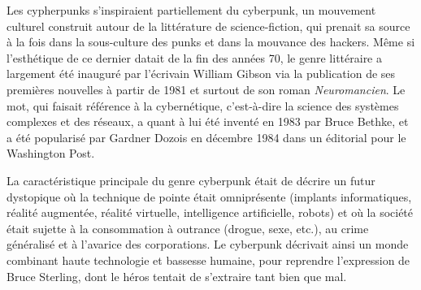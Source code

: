 Les cypherpunks s'inspiraient partiellement du cyberpunk, un mouvement culturel construit autour de la littérature de science-fiction, qui prenait sa source à la fois dans la sous-culture des punks et dans la mouvance des hackers. Même si l'esthétique de ce dernier datait de la fin des années 70, le genre littéraire a largement été inauguré par l'écrivain William Gibson via la publication de ses premières nouvelles à partir de 1981 et surtout de son roman \emph{Neuromancien}. Le mot, qui faisait référence à la cybernétique, c'est-à-dire la science des systèmes complexes et des réseaux, a quant à lui été inventé en 1983 par Bruce Bethke, et a été popularisé par Gardner Dozois en décembre 1984 dans un éditorial pour le Washington Post. %

La caractéristique principale du genre cyberpunk était de décrire un futur dystopique où la technique de pointe était omniprésente (implants informatiques, réalité augmentée, réalité virtuelle, intelligence artificielle, robots) et où la société était sujette à la consommation à outrance (drogue, sexe, etc.), au crime généralisé et à l'avarice des corporations. Le cyberpunk décrivait ainsi un monde combinant haute technologie et bassesse humaine, pour reprendre l'expression de Bruce Sterling, dont le héros tentait de s'extraire tant bien que mal. %

